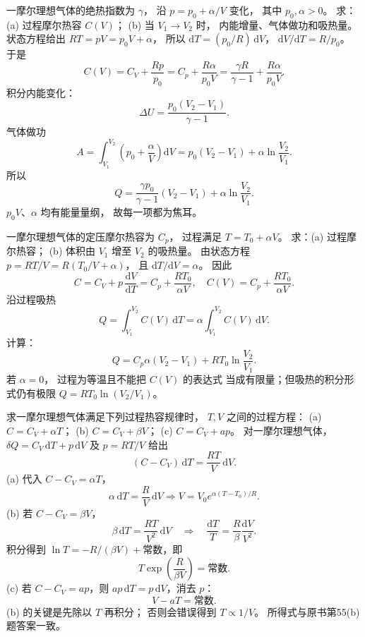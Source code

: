 一摩尔理想气体的绝热指数为 $\gamma$，
沿 $p=p_0+\alpha/V$ 变化，
其中 $p_0,\alpha>0$。
求：(a) 过程摩尔热容 $C(V)$；
(b) 当 $V_1\to V_2$ 时，
内能增量、气体做功和吸热量。
\exsolution
状态方程给出
$RT=pV=p_0V+\alpha$，
所以 $\mathrm dT=(p_0/R)\,\mathrm dV$，
$\mathrm dV/\mathrm dT=R/p_0$。
于是
\[
\boxed{C(V)=C_V+\frac{Rp}{p_0}
=C_p+\frac{R\alpha}{p_0V}
=\frac{\gamma R}{\gamma-1}+\frac{R\alpha}{p_0V}}.
\]
积分内能变化：
\[
\boxed{\Delta U=\frac{p_0(V_2-V_1)}{\gamma-1}}.
\]
气体做功
\[
\boxed{A=\int_{V_1}^{V_2}
\left(p_0+\frac{\alpha}{V}\right)\mathrm dV
=p_0(V_2-V_1)+\alpha\ln\frac{V_2}{V_1}}.
\]
所以
\[
\boxed{Q=\frac{\gamma p_0}{\gamma-1}(V_2-V_1)
+\alpha\ln\frac{V_2}{V_1}}.
\]
\excheck $p_0V$、$\alpha$ 均有能量量纲，
故每一项都为焦耳。

一摩尔理想气体的定压摩尔热容为 $C_p$，
过程满足 $T=T_0+\alpha V$。
求：(a) 过程摩尔热容；
(b) 体积由 $V_1$ 增至 $V_2$ 的吸热量。
\exsolution
由状态方程
$p=RT/V=R(T_0/V+\alpha)$，
且 $\mathrm dT/\mathrm dV=\alpha$。
因此
\[
C=C_V+p\,\frac{\mathrm dV}{\mathrm dT}
=C_p+\frac{RT_0}{\alpha V},
\quad
\boxed{C(V)=C_p+\frac{RT_0}{\alpha V}}.
\]
沿过程吸热
\[
Q=\int_{V_1}^{V_2}C(V)\,\mathrm dT
=\alpha\int_{V_1}^{V_2}C(V)\,\mathrm dV.
\]
计算：
\[
\boxed{Q=C_p\alpha(V_2-V_1)+
RT_0\ln\frac{V_2}{V_1}}.
\]
\excheck 若 $\alpha=0$，
过程为等温且不能把 $C(V)$ 的表达式
当成有限量；但吸热的积分形式仍有极限
$Q=RT_0\ln(V_2/V_1)$。

求一摩尔理想气体满足下列过程热容规律时，
$T,V$ 之间的过程方程：
(a) $C=C_V+\alpha T$；
(b) $C=C_V+\beta V$；
(c) $C=C_V+a p$。
\exsolution
对一摩尔理想气体，
$\delta Q=C_V\,\mathrm dT+p\,\mathrm dV$
及 $p=RT/V$ 给出
\[
(C-C_V)\,\mathrm dT
=\frac{RT}{V}\,\mathrm dV.
\]
(a) 代入 $C-C_V=\alpha T$，
\[
\alpha\,\mathrm dT=\frac R V\,\mathrm dV
\Longrightarrow
\boxed{V=V_0e^{\alpha(T-T_0)/R}}.
\]
(b) 若 $C-C_V=\beta V$，
\[
\beta\,\mathrm dT=\frac{RT}{V^2}\,\mathrm dV
\quad\Longrightarrow\quad
\frac{\mathrm dT}{T}=\frac R\beta\frac{\mathrm dV}{V^2}.
\]
积分得到
$\ln T=-R/(\beta V)+\text{常数}$，即
\[
\boxed{T\exp\left(\frac R{\beta V}\right)=\text{常数}}.
\]
(c) 若 $C-C_V=ap$，则
$ap\,\mathrm dT=p\,\mathrm dV$，消去 $p$：
\[
\boxed{V-aT=\text{常数}}.
\]
\excheck (b) 的关键是先除以 $T$ 再积分；
否则会错误得到 $T\propto1/V$。
所得式与原书第55(b)题答案一致。

